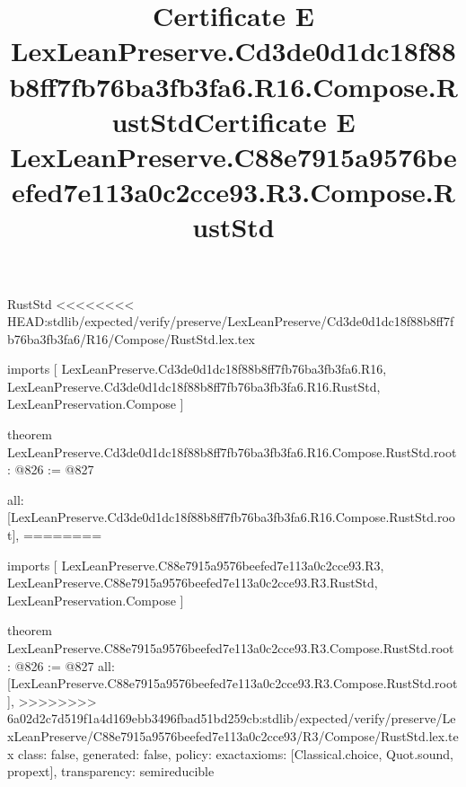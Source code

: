 \begin{lexlean}{RustStd}
<<<<<<<< HEAD:stdlib/expected/verify/preserve/LexLeanPreserve/Cd3de0d1dc18f88b8ff7fb76ba3fb3fa6/R16/Compose/RustStd.lex.tex
\title{Certificate E LexLeanPreserve.Cd3de0d1dc18f88b8ff7fb76ba3fb3fa6.R16.Compose.RustStd}
\begin{coremodule}
imports [
  LexLeanPreserve.Cd3de0d1dc18f88b8ff7fb76ba3fb3fa6.R16,
  LexLeanPreserve.Cd3de0d1dc18f88b8ff7fb76ba3fb3fa6.R16.RustStd,
  LexLeanPreservation.Compose
]

theorem LexLeanPreserve.Cd3de0d1dc18f88b8ff7fb76ba3fb3fa6.R16.Compose.RustStd.root : @826 := @827 {
  all: [LexLeanPreserve.Cd3de0d1dc18f88b8ff7fb76ba3fb3fa6.R16.Compose.RustStd.root],
========
\title{Certificate E LexLeanPreserve.C88e7915a9576beefed7e113a0c2cce93.R3.Compose.RustStd}
\begin{coremodule}
imports [
  LexLeanPreserve.C88e7915a9576beefed7e113a0c2cce93.R3,
  LexLeanPreserve.C88e7915a9576beefed7e113a0c2cce93.R3.RustStd,
  LexLeanPreservation.Compose
]

theorem LexLeanPreserve.C88e7915a9576beefed7e113a0c2cce93.R3.Compose.RustStd.root : @826 := @827 {
  all: [LexLeanPreserve.C88e7915a9576beefed7e113a0c2cce93.R3.Compose.RustStd.root],
>>>>>>>> 6a02d2c7d519f1a4d169ebb3496fbad51bd259cb:stdlib/expected/verify/preserve/LexLeanPreserve/C88e7915a9576beefed7e113a0c2cce93/R3/Compose/RustStd.lex.tex
  class: false,
  generated: false,
  policy: exact{axioms: [Classical.choice, Quot.sound, propext]},
  transparency: semireducible
}


\end{coremodule}}
\end{coremodule}
\end{lexlean}
